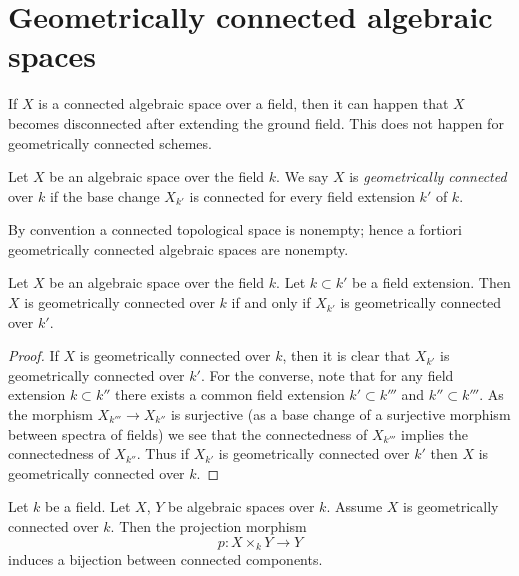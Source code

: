 \section{Geometrically connected algebraic spaces}
\label{section-geometrically-connected}

\noindent
If $X$ is a connected algebraic space over a field, then it can happen that
$X$ becomes disconnected after extending the ground field. This does not
happen for geometrically connected schemes.

\begin{definition}
\label{definition-geometrically-connected}
Let $X$ be an algebraic space over the field $k$. We say $X$ is
{\it geometrically connected} over $k$ if the base change $X_{k'}$
is connected for every field extension $k'$ of $k$.
\end{definition}

\noindent
By convention a connected topological space is nonempty; hence a fortiori
geometrically connected algebraic spaces are nonempty.

\begin{lemma}
\label{lemma-geometrically-connected-check-after-extension}
Let $X$ be an algebraic space over the field $k$.
Let $k \subset k'$ be a field extension.
Then $X$ is geometrically connected over $k$ if and only if
$X_{k'}$ is geometrically connected over $k'$.
\end{lemma}

\begin{proof}
If $X$ is geometrically connected over $k$, then it is clear that
$X_{k'}$ is geometrically connected over $k'$. For the converse, note
that for any field extension $k \subset k''$ there exists a common
field extension $k' \subset k'''$ and $k'' \subset k'''$. As the
morphism $X_{k'''} \to X_{k''}$ is surjective (as a base change of
a surjective morphism between spectra of fields) we see that the
connectedness of $X_{k'''}$ implies the connectedness of $X_{k''}$.
Thus if $X_{k'}$ is geometrically connected over $k'$ then
$X$ is geometrically connected over $k$.
\end{proof}

\begin{lemma}
\label{lemma-bijection-connected-components}
Let $k$ be a field. Let $X$, $Y$ be algebraic spaces over $k$.
Assume $X$ is geometrically connected over $k$.
Then the projection morphism
$$
p : X \times_k Y \longrightarrow Y
$$
induces a bijection between connected components.
\end{lemma}

